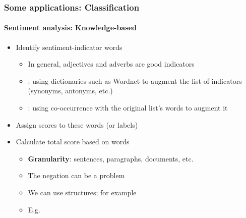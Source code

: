 \documentclass[xcolor=table]{beamer}
\begin{document}
\begin{frame}
	\frametitle{Some applications: Classification}
	\framesubtitle{Sentiment analysis: Knowledge-based}
	
	\begin{itemize}
		\item Identify sentiment-indicator words
		\begin{itemize}
			\item In general, adjectives and adverbs are good indicators
			\item {}: using dictionaries such as Wordnet to augment the list of indicators (synonyms, antonyms, etc.) 
			\item {}: using co-occurrence with the original list's words to augment it 
		\end{itemize}
		\item Assign scores to these words (or labels)
		\item Calculate total score based on words
		\begin{itemize}
			\item \textbf{Granularity}: sentences, paragraphs, documents, etc. 
			\item The negation can be a problem
			\item We can use structures; for example 
			\item E.g. 
		\end{itemize}
	\end{itemize}
	
\end{frame}
\end{document}
